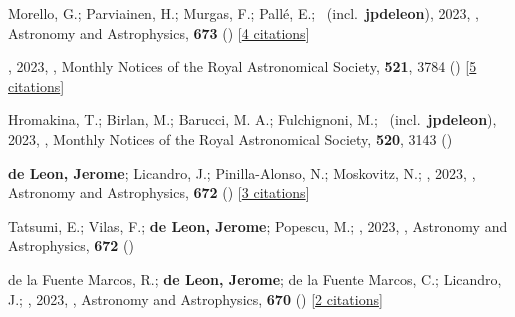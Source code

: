 \item[{\color{numcolor}\scriptsize179}] Morello, G.; Parviainen, H.; Murgas, F.; Pall{\'e}, E.; \etal\ (incl.\ \textbf{jpdeleon}), 2023, , Astronomy and Astrophysics, \textbf{673} () [\href{https://ui.adsabs.harvard.edu/abs/2023A&A...673A..32M}{4 citations}]

\item[{\color{numcolor}\scriptsize178}] , 2023, , Monthly Notices of the Royal Astronomical Society, \textbf{521}, 3784 () [\href{https://ui.adsabs.harvard.edu/abs/2023MNRAS.521.3784L}{5 citations}]

\item[{\color{numcolor}\scriptsize177}] Hromakina, T.; Birlan, M.; Barucci, M. A.; Fulchignoni, M.; \etal\ (incl.\ \textbf{jpdeleon}), 2023, , Monthly Notices of the Royal Astronomical Society, \textbf{520}, 3143 ()

\item[{\color{numcolor}\scriptsize176}] \textbf{de Leon, Jerome}; Licandro, J.; Pinilla-Alonso, N.; Moskovitz, N.; \etal, 2023, , Astronomy and Astrophysics, \textbf{672} () [\href{https://ui.adsabs.harvard.edu/abs/2023A&A...672A.174D}{3 citations}]

\item[{\color{numcolor}\scriptsize175}] Tatsumi, E.; Vilas, F.; \textbf{de Leon, Jerome}; Popescu, M.; \etal, 2023, , Astronomy and Astrophysics, \textbf{672} ()

\item[{\color{numcolor}\scriptsize174}] de la Fuente Marcos, R.; \textbf{de Leon, Jerome}; de la Fuente Marcos, C.; Licandro, J.; \etal, 2023, , Astronomy and Astrophysics, \textbf{670} () [\href{https://ui.adsabs.harvard.edu/abs/2023A&A...670L..10D}{2 citations}]

